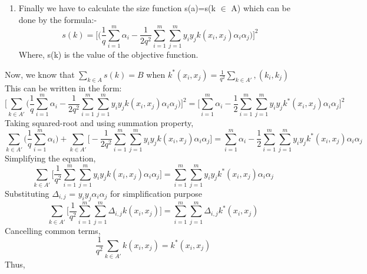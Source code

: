 \documentclass[12pt,a4paper,final]{report}
\begin{document}
{{{{\begin{itemize}
\begin{enumerate}
\begin{equation}
\end{equation} 
\item
Finally we have to calculate the size function s(a)=s(k $\in$ A) which can be done by the formula:- \\
\begin{equation}
s(k) = \Big[\big(\frac{1}{q}\sum_{i=1}^{m}\alpha_i - \frac{1}{2q^2}\sum_{i=1}^{m}\sum_{j=1}^{m}y_iy_jk(x_i,x_j)\alpha_i\alpha_j\Big)\Big]^2
\end{equation}
Where, s(k) is the value of the objective function. 
\end{enumerate} 
Now, we know that $\sum_{k \in A}^{}s(k)=B$ when $k^*(x_i,x_j)=\frac{1}{q^2}\sum_{k \in A'}^{},(k_i,k_j)$ \\
This can be written in the form: \\
\begin{equation}
\Big[\sum_{k \in A'}^{}\Big(\frac{1}{q}\sum_{i=1}^{m}\alpha_i - \frac{1}{2q^2}\sum_{i=1}^{m}\sum_{j=1}^{m}y_iy_jk(x_i,x_j)\alpha_i\alpha_j\Big) \Big]^2 = \Big[\sum_{i=1}^{m} \alpha_i - \frac{1}{2}\sum_{i=1}^{m}\sum_{j=1}^{m}y_iy_jk^*(x_i,x_j)\alpha_i\alpha_j\Big]^2
\end{equation}
Taking squared-root and using summation property, \\
\begin{equation}
\sum_{k \in A'}\Big(\frac{1}{q}\sum_{i=1}^{m}\alpha_i\Big)+\sum_{k \in A'}^{}\Big[-\frac{1}{2q^2}\sum_{i=1}^{m}\sum_{j=1}^{m}y_iy_jk(x_i,x_j)\alpha_i\alpha_j\Big] = \sum_{i=1}^{m}\alpha_i-\frac{1}{2}\sum_{i=1}^{m}\sum_{j=1}^{m}y_iy_jk^*(x_i,x_j)\alpha_i\alpha_j
\end{equation}
Simplifying the equation,
\begin{equation}
\sum_{k \in A'}\Big[\frac{1}{q^2}\sum_{i=1}^{m}\sum_{j=1}^{m}y_iy_jk(x_i,x_j)\alpha_i\alpha_j\Big] = \sum_{i=1}^{m}\sum_{j=1}^{m}y_iy_jk^*(x_i,x_j)\alpha_i\alpha_j
\end{equation}
Substituting $\Delta_{i,j}$ = $y_iy_j\alpha_i\alpha_j$ for simplification purpose \\
\begin{equation}
\sum_{k \in A'}\Big[\frac{1}{q^2}\sum_{i=1}^{m}\sum_{j=1}^{m}\Delta_{i,j}k(x_i,x_j)\Big] = \sum_{i=1}^{m}\sum_{j=1}^{m}\Delta_{i,j}k^*(x_i,x_j)
\end{equation}
Cancelling common terms,
\begin{equation}
\frac{1}{q^2}\sum_{k \in A'}{}k(x_i,x_j)=k^*(x_i,x_j)
\end{equation}
Thus, 
\begin{equation}

\end{equation}
\end{itemize}}}}}
\end{document}

